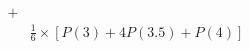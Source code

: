 \documentclass[preview]{standalone}
\begin{document}
\begin{align*}
+&\\&\frac{1}{6}\times[P(3)+4P(3.5)+P(4)]
\end{align*}
\end{document}
